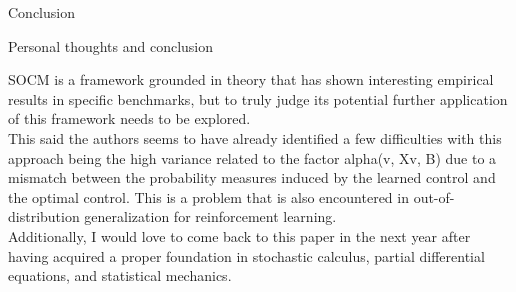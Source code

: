 \documentclass[aspectratio=169,xcolor=dvipsnames]{beamer}
\begin{document}
\begin{frame}{Conclusion}

    \begin{block}{Personal thoughts and conclusion}

    SOCM is a framework grounded in theory that has shown interesting empirical results in specific benchmarks, but to truly judge its potential further application of this framework needs to be explored. 
    \\
    \vspace{0.2cm}
    This said the authors seems to have already identified a few difficulties with this approach being the high variance related to the factor alpha(v, Xv, B) due to a mismatch between the probability measures induced by the learned control and the optimal control. This is a problem that is also encountered in out-of-distribution generalization for reinforcement learning.
    \\
    \vspace{0.2cm}
    Additionally, I would love to come back to this paper in the next year after having acquired a proper foundation in stochastic calculus, partial differential equations, and statistical mechanics.

    \end{block}

\end{frame}


\end{document}
